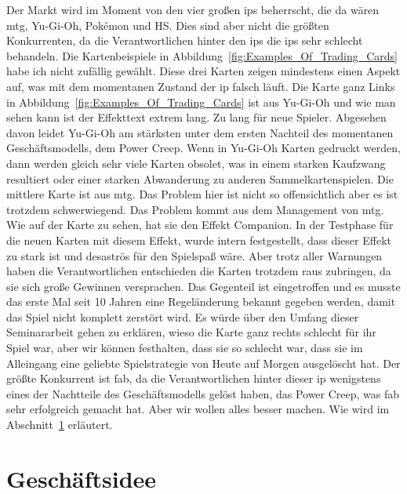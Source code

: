\documentclass[fontsize=11, a4aper]{scrartcl}
\begin{document}
\noindent Der Markt wird im Moment von den vier großen \acp{ip} beherrscht, die da wären \acl{mtg}, Yu-Gi-Oh, Pok\'emon und \acl{HS}. Dies sind aber nicht die größten Konkurrenten, da die Verantwortlichen hinter den \acp{ip} die \acp{ip} sehr schlecht behandeln. Die Kartenbeispiele in Abbildung~\ref{fig:Examples_Of_Trading_Cards} habe ich nicht zufällig gewählt. Diese drei Karten zeigen mindestens einen Aspekt auf, was mit dem momentanen Zustand der \acl{ip} falsch läuft. Die Karte ganz Links in Abbildung~\ref{fig:Examples_Of_Trading_Cards} ist aus Yu-Gi-Oh und wie man sehen kann ist der Effekttext extrem lang. Zu lang für neue Spieler. Abgesehen davon leidet Yu-Gi-Oh am stärksten unter dem ersten Nachteil des momentanen Geschäftsmodells, dem \glqq Power Creep\grqq. Wenn in Yu-Gi-Oh Karten gedruckt werden, dann werden gleich sehr viele Karten obsolet, was in einem starken Kaufzwang resultiert oder einer starken Abwanderung zu anderen Sammelkartenspielen. Die mittlere Karte ist aus \acl{mtg}. Das Problem hier ist nicht so offensichtlich aber es ist trotzdem schwerwiegend. Das Problem kommt aus dem Management von \ac{mtg}. Wie auf der Karte zu sehen, hat sie den Effekt \glqq Companion\grqq. In der Testphase für die neuen Karten mit diesem Effekt, wurde intern festgestellt, dass dieser Effekt zu stark ist und desaströs für den Spielspaß wäre. Aber trotz aller Warnungen haben die Verantwortlichen entschieden die Karten trotzdem raus zubringen, da sie sich große Gewinnen versprachen. Das Gegenteil ist eingetroffen und es musste das erste Mal seit 10 Jahren eine Regeländerung bekannt gegeben werden, damit das Spiel nicht komplett zerstört wird. Es würde über den Umfang dieser Seminararbeit gehen zu erklären, wieso die Karte ganz rechts schlecht für ihr Spiel war, aber wir können festhalten, dass sie so schlecht war, dass sie im Alleingang eine geliebte Spielstrategie von Heute auf Morgen ausgelöscht hat. Der größte Konkurrent ist \acl{fab}, da die Verantwortlichen hinter dieser \ac{ip} wenigstens eines der Nachtteile des Geschäftsmodells gelöst haben, das \glqq Power Creep\grqq, was \ac{fab} sehr erfolgreich gemacht hat. Aber wir wollen alles besser machen. Wie wird im Abschnitt~\ref{sec:Geschaeftidee} erläutert.


\section{Geschäftsidee} \label{sec:Geschaeftidee}
\end{document}
